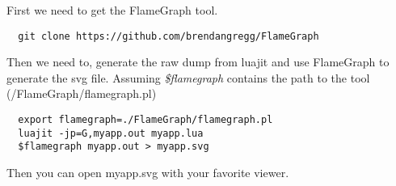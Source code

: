 First we need to get the FlameGraph \cite{flamegraph} tool.
\begin{center}
\begin{lstlisting}
  git clone https://github.com/brendangregg/FlameGraph
\end{lstlisting}
\end{center}
Then we need to, generate the raw dump from luajit and use FlameGraph to generate
the svg file. Assuming \emph{\$flamegraph} contains the path to the tool (/FlameGraph/flamegraph.pl)

\begin{center}
\begin{lstlisting}
  export flamegraph=./FlameGraph/flamegraph.pl
  luajit -jp=G,myapp.out myapp.lua
  $flamegraph myapp.out > myapp.svg
\end{lstlisting}
\end{center}
Then you can open myapp.svg with your favorite viewer.
